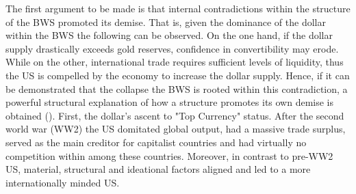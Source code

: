 \documentclass[11pt]{article}
\begin{document}
The first argument to be made is that internal contradictions within the structure of the  BWS promoted its demise. 
That is, given the dominance of the dollar within the BWS the following can be observed.
On the one hand,  if the dollar supply drastically exceeds gold reserves, confidence in convertibility may erode. While on the other, international trade requires sufficient levels of liquidity, thus the US is compelled by the economy to increase the dollar supply. Hence, if it can be demonstrated that the collapse the BWS is rooted within this contradiction, a powerful structural explanation of how a structure promotes its own demise is obtained
(\cite{KlimiukZbigniew2016TPaO, bordo2014tales}).  
First, the dollar's ascent to "Top Currency" status.
After the second world war (WW2) the US domitated global output, had a massive trade surplus, served as the main creditor for capitalist countries and had virtually no competition within among these countries.
Moreover, in contrast to pre-WW2 US, material, structural and ideational factors aligned and led to a more internationally minded US.
\end{document}
